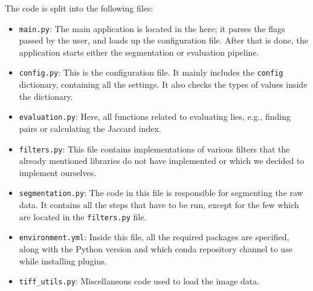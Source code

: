 \documentclass[
  digital,     %
  oneside,     %
  nosansbold,  %
  nocolorbold, %
  lof,         %
  lot,         %
]{fithesis4}
\begin{document}
The code is split into the following files: 
\begin{itemize}
    \item \texttt{main.py}: The main application is located in the
        here; it parses the flags passed by the user, and loads
        up the configuration file. After that is done, the application starts
        either the segmentation or evaluation pipeline.
    \item \texttt{config.py}: This is the configuration file. It mainly includes
        the \texttt{config} dictionary, containing all the settings. It also
        checks the types of values inside the dictionary.
    \item \texttt{evaluation.py}: Here, all functions related to evaluating
        lies, e.g., finding pairs or calculating the Jaccard index.
    \item \texttt{filters.py}: This file contains implementations of various
        filters that the already mentioned libraries do not have implemented
        or which we decided to implement ourselves.
    \item \texttt{segmentation.py}: The code in this file is responsible for
        segmenting the raw data. It contains all the steps that have to be
        run, except for the few which are located in the \texttt{filters.py}
        file.
    \item \texttt{environment.yml}: Inside this file, all the required packages
        are specified, along with the Python version and which conda repository 
        channel to use while installing plugins.
    \item \texttt{tiff\_utils.py}: Miscellaneous code used
        to load the image data.
\end{itemize}
\end{document}
